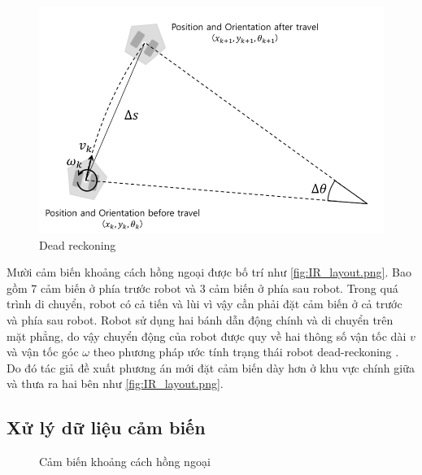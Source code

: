 \begin{figure}[htbp]
    \centering
    \includegraphics[width=0.7\linewidth]{figures/dead-reckoning.png}
    \caption{Dead reckoning \cite{pyo2017ros}}
    \label{fig:dead-reckoning}
\end{figure}

Mười cảm biến khoảng cách hồng ngoại được bố trí như \figurename{\ref{fig:IR_layout.png}}. Bao gồm 7 cảm biến ở phía trước robot và 3 cảm biến ở phía sau robot. 
Trong quá trình di chuyển, robot có cả tiến và lùi vì vậy cần phải đặt cảm biến ở cả trước và phía sau robot. 
Robot sử dụng hai bánh dẫn động chính và di chuyển trên mặt phẳng, do vậy chuyển động của robot được quy về hai thông số vận tốc dài $v$ và vận tốc góc $\omega$ theo phương pháp ước tính trạng thái robot dead-reckoning \cite{pyo2017ros}. 
Do đó tác giả đề xuất phương án mới đặt cảm biến dày hơn ở khu vực chính giữa và thưa ra hai bên như \figurename{\ref{fig:IR_layout.png}}. 

\subsection{Xử lý dữ liệu cảm biến}

\begin{figure}[htbp]
    \centering
    \caption{Cảm biến khoảng cách hồng ngoại}
    \label{fig:irSharp_theory}
\end{figure}
        
